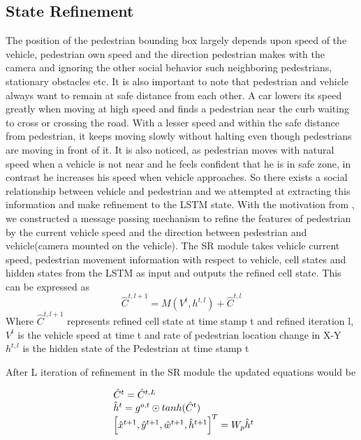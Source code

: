 \subsection{State Refinement}
The position of the pedestrian bounding box largely depends upon speed of the vehicle, pedestrian own speed and the direction pedestrian makes with the camera and ignoring the other social behavior such neighboring pedestrians, stationary obstacles etc. It is also important to note that pedestrian and vehicle always want to remain at safe distance from each other. A car lowers its speed greatly when moving at high speed and finds a pedestrian near the curb waiting to cross or crossing the road. With a lesser speed and within the safe distance from pedestrian, it keeps moving slowly without halting even though pedestrians are moving in front of it.
It is also noticed, as pedestrian moves with natural speed when a vehicle is not near and he feels confident that he is in safe zone, in contrast he increases his speed when vehicle approaches. So there exists a social relationship between vehicle and pedestrian and we attempted at extracting this information and make refinement to the LSTM state. With the motivation from \cite{zhang2019sr}, we constructed a message passing mechanism to refine the features of pedestrian by the current vehicle speed and the direction between pedestrian and vehicle(camera mounted on the vehicle). The SR module takes vehicle current speed, pedestrian movement information with respect to vehicle, cell states and hidden states from the LSTM as input and outputs the refined cell state. This can be expressed as 
\begin{equation}
\hat{C}^{t, l+1}= M(V^t, {h}^{t, l}) + \hat{C}^{t, l}
\end{equation}
Where $\hat{C}^{t, l+1}$ represents refined cell state at time stamp t and refined iteration l, $V^t$ is the vehicle speed at time t and rate of pedestrian location change in X-Y \\
${h}^{t, l}$ is the hidden state of the Pedestrian at time stamp t

After L iteration of refinement in the SR module the updated equations would be

\begin{equation}
\begin{array}{l@{}}
\hat{C}^{t}=\hat{C}^{t, L} \\
\hat{h}^{t}={g}^{o,t} \odot  tanh(\hat{C}^{t}) \\
\left[ \hat{x}^{t+1}, \hat{y}^{t+1}, \hat{w}^{t+1}, \hat{h}^{t+1} \right] ^ T = W_p\hat{h}^{t}
\end{array}
\end{equation}

